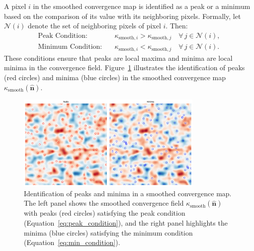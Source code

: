 A pixel $i$ in the smoothed convergence map is identified as a peak or a minimum based on the comparison of its value with its neighboring pixels. Formally, let $\mathcal{N}(i)$ denote the set of neighboring pixels of pixel $i$. Then:
\begin{align}
    \text{Peak Condition:} \quad & \kappa_{\mathrm{smooth}, i} > \kappa_{\mathrm{smooth}, j} \quad \forall \, j \in \mathcal{N}(i), \label{eq:peak_condition} \\
    \text{Minimum Condition:} \quad & \kappa_{\mathrm{smooth}, i} < \kappa_{\mathrm{smooth}, j} \quad \forall \, j \in \mathcal{N}(i). \label{eq:min_condition}
\end{align}
These conditions ensure that peaks are local maxima and minima are local minima in the convergence field.
Figure~\ref{fig:peak_min} illustrates the identification of peaks (red circles) and minima (blue circles) in the smoothed convergence map $\kappa_{\mathrm{smooth}}(\hat{\mathbf{n}})$.
\begin{figure}[ht]
    \centering
    \includegraphics[width=0.8\textwidth]{figures/peaks_minima.png}
    \caption{Identification of peaks and minima in a smoothed convergence map. The left panel shows the smoothed convergence field $\kappa_{\mathrm{smooth}}(\hat{\mathbf{n}})$ with peaks (red circles) satisfying the peak condition (Equation~\eqref{eq:peak_condition}), and the right panel highlights the minima (blue circles) satisfying the minimum condition (Equation~\eqref{eq:min_condition}).}
    \label{fig:peak_min}
\end{figure}

